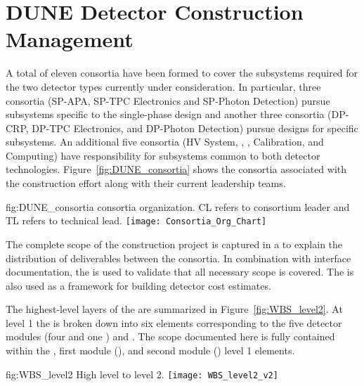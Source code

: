 \section{DUNE Detector Construction Management}
\label{sec:es-tc-det-mgmt}


A total of eleven  consortia have been formed to cover 
the subsystems required for the two detector types currently under
consideration.  In particular, three consortia (SP-APA, SP-TPC
Electronics and SP-Photon Detection) pursue subsystems specific to
the single-phase design and another three consortia (DP-CRP, DP-TPC
Electronics, and DP-Photon Detection) pursue designs for 
specific subsystems.  An additional five consortia (HV System, ,
, Calibration, and Computing)
have responsibility for subsystems common to both detector
technologies.  Figure~\ref{fig:DUNE_consortia} shows the consortia 
associated with the  construction effort along with their 
current leadership teams.  
\begin{dunefigure}{fig:DUNE_consortia}
  { consortia organization. CL refers to consortium leader
    and TL refers to technical lead.}
  \texttt{[image: Consortia\_Org\_Chart]}
\end{dunefigure}

The complete scope of the  construction project is captured in a 
 to explain the distribution of deliverables between 
the consortia.  In combination with interface documentation, the 
 is used to validate that all necessary scope is covered.  The 
 is also used as a framework for building  
detector cost estimates.

The highest-level layers of the   are summarized 
in Figure~\ref{fig:WBS_level2}.  At level 1 the  is broken down into 
six elements corresponding to the five  detector modules (four 
 and one ) and .  The scope documented
here is fully contained within the , first  module 
(), and second  module () level 1 elements.   
\begin{dunefigure}{fig:WBS_level2}
  {High level   to level 2.}
  \texttt{[image: WBS\_level2\_v2]}
\end{dunefigure}

